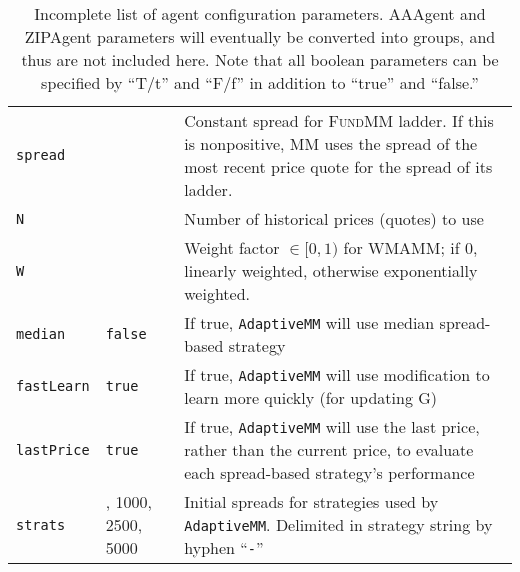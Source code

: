 \documentclass[11pt]{article}
\begin{document}
\begin{table}
\begin{tabular}{p{} >{\centering\arraybackslash}p{} p{}}
\texttt{spread} & -1 &	 Constant spread for \textsc{FundMM} ladder. If this is nonpositive, MM uses the spread of the most recent price quote for the spread of its ladder. \\
\texttt{N} 	& 5 & Number of historical prices (quotes) to use \\
\texttt{W} 	& 0 & Weight factor $\in [0,1)$ for \textsc{WMAMM}; if 0, linearly weighted, otherwise exponentially weighted. \\

\texttt{median} 	& \texttt{false}	& If true, \texttt{AdaptiveMM} will use median spread-based strategy \\
\texttt{fastLearn}	 & \texttt{true} & If true, \texttt{AdaptiveMM} will use modification to learn more quickly (for updating G) \\
\texttt{lastPrice} & \texttt{true} & If true, \texttt{AdaptiveMM} will use the last price, rather than the current price, to evaluate each spread-based strategy's performance \\
\texttt{strats} 	& 500, 1000, 2500, 5000 & Initial spreads for strategies used by \texttt{AdaptiveMM}. Delimited in strategy string by hyphen ``\texttt{-}'' \\

\end{tabular}
\caption{Incomplete list of agent configuration parameters. AAAgent and ZIPAgent parameters will eventually be converted into groups, and thus are not included here. Note that all boolean parameters can be specified by ``T/t'' and ``F/f'' in addition to ``true'' and ``false.''}
\label{tab:ag}
\end{table}
\end{document}
